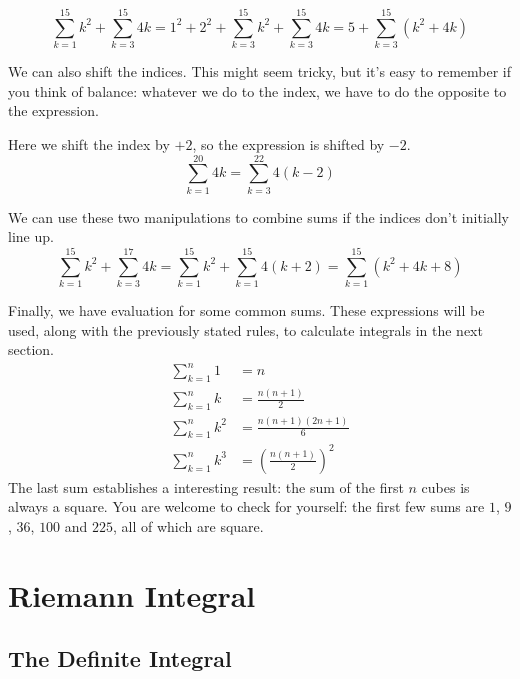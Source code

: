 \documentclass[fleqn]{report}
\begin{document}
\begin{example}
\begin{equation*}
\sum_{k=1}^{15} k^2 + \sum_{k=3}^{15} 4k =
1^2 + 2^2 + \sum_{k=3}^{15} k^2 + \sum_{k=3}^{15} 4k 
= 5 + \sum_{k=3}^{15} (k^2 + 4k)
\end{equation*}
\end{example}

We can also shift the indices. This might seem tricky, but
it's easy to remember if you think of balance: whatever we do
to the index, we have to do the opposite to the expression.

\begin{example} Here we shift the index by $+2$, so the
expression is shifted by $-2$.
\begin{equation*}
\sum_{k=1}^{20} 4k = \sum_{k=3}^{22} 4(k-2)
\end{equation*}
\end{example}

\begin{example}
We can use these two manipulations to combine sums if the
indices don't initially line up.
\begin{equation*}
\sum_{k=1}^{15} k^2 + \sum_{k=3}^{17} 4k 
= \sum_{k=1}^{15} k^2 + \sum_{k=1}^{15} 4(k+2) 
= \sum_{k=1}^{15} (k^2 + 4k + 8)
\end{equation*}
\end{example}

Finally, we have evaluation for some common sums.
These expressions will be used, along with the previously
stated rules, to calculate integrals in the next section.
\begin{align*}
\sum_{k=1}^n 1 & = n \\
\sum_{k=1}^n k & = \frac{n(n+1)}{2} \\
\sum_{k=1}^n k^2 & = \frac{n(n+1)(2n+1)}{6} \\
\sum_{k=1}^n k^3 & = \left(\frac{n(n+1)}{2} \right)^2 
\end{align*}
The last sum establishes a interesting result: the sum of the
first $n$ cubes is always a square. You are welcome to check
for yourself: the first few sums are $1$, $9$, $36$, $100$ and
$225$, all of which are square. 

\chapter{Riemann Integral}
\label{Riemann Integral}

\section*{The Definite Integral}
\end{document}
